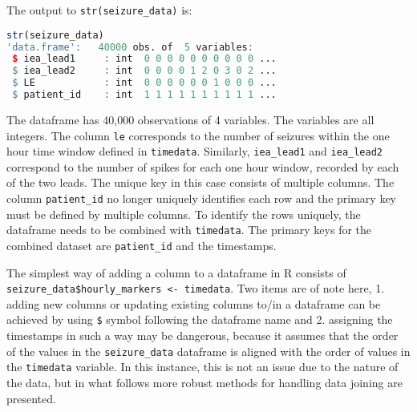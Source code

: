 The output to \verb|str(seizure_data)| is:
\begin{lstlisting}[language=R]
str(seizure_data)
'data.frame':	40000 obs. of  5 variables:
 $ iea_lead1     : int  0 0 0 0 0 0 0 0 0 0 ...
 $ iea_lead2     : int  0 0 0 0 1 2 0 3 0 2 ...
 $ LE            : int  0 0 0 0 0 0 1 0 0 0 ...
 $ patient_id    : int  1 1 1 1 1 1 1 1 1 1 ...
\end{lstlisting}
The dataframe has 40,000 observations of 4 variables. The variables are all integers. The column \verb|le| corresponds to the number of seizures within the one hour time window defined in \verb|timedata|. Similarly, \verb|iea_lead1| and \verb|iea_lead2| correspond to the number of spikes for each one hour window, recorded by each of the two leads. The unique key in this case consists of multiple columns. The column \verb|patient_id| no longer uniquely identifies each row and the primary key must be defined by multiple columns. To identify the rows uniquely, the dataframe needs to be combined with \verb|timedata|. The primary keys for the combined dataset are \verb|patient_id| and the timestamps.

The simplest way of adding a column to a dataframe in R consists of \verb|seizure_data$hourly_markers <- timedata|. Two items are of note here, 1. adding new columns or updating existing columns to/in a dataframe can be achieved by using \verb|$| symbol following the dataframe name and 2. assigning the timestamps in such a way may be dangerous, because it assumes that the order of the values in the \verb|seizure_data| dataframe is aligned with the order of values in the \verb|timedata| variable. In this instance, this is not an issue due to the nature of the data, but in what follows more robust methods for handling data joining are presented.

